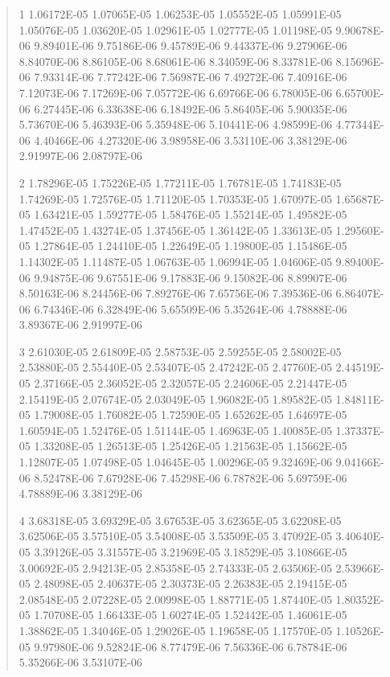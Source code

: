 \documentclass[letterpaper,10pt,english]{sphinxmanual}
\begin{document}
\begin{quote}
\begin{DUlineblock}{0em}
\item[]
\begin{DUlineblock}{\DUlineblockindent}
\item[] 1   1.06172E-05  1.07065E-05  1.06253E-05  1.05552E-05  1.05991E-05  1.05076E-05  1.03620E-05  1.02961E-05  1.02777E-05  1.01198E-05  9.90678E-06  9.89401E-06  9.75186E-06  9.45789E-06  9.44337E-06  9.27906E-06  8.84070E-06  8.86105E-06  8.68061E-06  8.34059E-06  8.33781E-06  8.15696E-06  7.93314E-06  7.77242E-06  7.56987E-06  7.49272E-06  7.40916E-06  7.12073E-06  7.17269E-06  7.05772E-06  6.69766E-06  6.78005E-06  6.65700E-06  6.27445E-06  6.33638E-06  6.18492E-06  5.86405E-06  5.90035E-06  5.73670E-06  5.46393E-06  5.35948E-06  5.10441E-06  4.98599E-06  4.77344E-06  4.40466E-06  4.27320E-06  3.98958E-06  3.53110E-06  3.38129E-06  2.91997E-06  2.08797E-06
\item[] 2   1.78296E-05  1.75226E-05  1.77211E-05  1.76781E-05  1.74183E-05  1.74269E-05  1.72576E-05  1.71120E-05  1.70353E-05  1.67097E-05  1.65687E-05  1.63421E-05  1.59277E-05  1.58476E-05  1.55214E-05  1.49582E-05  1.47452E-05  1.43274E-05  1.37456E-05  1.36142E-05  1.33613E-05  1.29560E-05  1.27864E-05  1.24410E-05  1.22649E-05  1.19800E-05  1.15486E-05  1.14302E-05  1.11487E-05  1.06763E-05  1.06994E-05  1.04606E-05  9.89400E-06  9.94875E-06  9.67551E-06  9.17883E-06  9.15082E-06  8.89907E-06  8.50163E-06  8.24456E-06  7.89276E-06  7.65756E-06  7.39536E-06  6.86407E-06  6.74346E-06  6.32849E-06  5.65509E-06  5.35264E-06  4.78888E-06  3.89367E-06  2.91997E-06
\item[] 3   2.61030E-05  2.61809E-05  2.58753E-05  2.59255E-05  2.58002E-05  2.53880E-05  2.55440E-05  2.53407E-05  2.47242E-05  2.47760E-05  2.44519E-05  2.37166E-05  2.36052E-05  2.32057E-05  2.24606E-05  2.21447E-05  2.15419E-05  2.07674E-05  2.03049E-05  1.96082E-05  1.89582E-05  1.84811E-05  1.79008E-05  1.76082E-05  1.72590E-05  1.65262E-05  1.64697E-05  1.60594E-05  1.52476E-05  1.51144E-05  1.46963E-05  1.40085E-05  1.37337E-05  1.33208E-05  1.26513E-05  1.25426E-05  1.21563E-05  1.15662E-05  1.12807E-05  1.07498E-05  1.04645E-05  1.00296E-05  9.32469E-06  9.04166E-06  8.52478E-06  7.67928E-06  7.45298E-06  6.78782E-06  5.69759E-06  4.78889E-06  3.38129E-06
\item[] 4   3.68318E-05  3.69329E-05  3.67653E-05  3.62365E-05  3.62208E-05  3.62506E-05  3.57510E-05  3.54008E-05  3.53509E-05  3.47092E-05  3.40640E-05  3.39126E-05  3.31557E-05  3.21969E-05  3.18529E-05  3.10866E-05  3.00692E-05  2.94213E-05  2.85358E-05  2.74333E-05  2.63506E-05  2.53966E-05  2.48098E-05  2.40637E-05  2.30373E-05  2.26383E-05  2.19415E-05  2.08548E-05  2.07228E-05  2.00998E-05  1.88771E-05  1.87440E-05  1.80352E-05  1.70708E-05  1.66433E-05  1.60274E-05  1.52442E-05  1.46061E-05  1.38862E-05  1.34046E-05  1.29026E-05  1.19658E-05  1.17570E-05  1.10526E-05  9.97980E-06  9.52824E-06  8.77479E-06  7.56336E-06  6.78784E-06  5.35266E-06  3.53107E-06

\end{DUlineblock}
\end{DUlineblock}
\end{quote}
\end{document}
